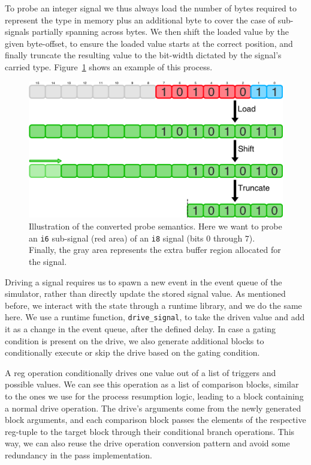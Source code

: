 To probe an integer signal we thus always load the number of bytes required to represent the type in memory plus an additional byte to cover the case of sub-signals partially spanning across bytes. We then shift the loaded value by the given byte-offset, to ensure the loaded value starts at the correct position, and finally truncate the resulting value to the bit-width dictated by the signal's carried type. Figure~\ref{fig:prb} shows an example of this process.

\begin{figure}[ht]
    \includegraphics[width=\textwidth]{gfx/Probe.png}
    \caption[Illustration of the converted probe semantics.]{Illustration of the converted probe semantics. Here we want to probe an \texttt{i6} sub-signal (red area) of an \texttt{i8} signal (bits $0$
        through $7$). Finally, the gray area represents the extra buffer region allocated for the signal.}
    \label{fig:prb}
\end{figure}

Driving a signal requires us to spawn a new event in the event queue of the simulator, rather than directly update the stored signal value. As mentioned before, we interact with the state through a runtime library, and we do the same here. We use a runtime function, \texttt{drive\_signal}, to take the driven value and add it as a change in the event queue, after the defined delay.
In case a gating condition is present on the drive, we also generate additional blocks to conditionally execute or skip the drive based on the gating condition.

A reg operation conditionally drives one value out of a list of triggers and possible values. We can see this operation as a list of comparison blocks, similar to the ones we use for the process resumption logic, leading to a block containing a normal drive operation. The drive's arguments come from the newly generated block arguments, and each comparison block passes the elements of the respective reg-tuple to the target block through their conditional branch operations. This way, we can also reuse the drive operation conversion pattern and avoid some redundancy in the pass implementation.

